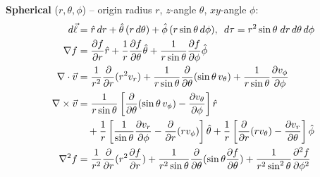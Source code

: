 \documentclass[12pt, a4paper]{article}
\begin{document}
\begin{multicols*}{3}
\textbf{Spherical} ($r, \theta, \phi$) -- origin radius $r$, $z$-angle $\theta$, $xy$-angle $\phi$: 
\begin{align*}
  d\vec{\ell} &= \hat{r}\,dr 
        + \hat{\theta}\,(r\,d\theta)
        + \hat{\phi}\,(r\sin\theta\,d\phi),\hspace{0.5em} d\tau = r^{2}\sin\theta \;dr\,d\theta\,d\phi\\
  \nabla f &= \frac{\partial f}{\partial r}\hat{r} + \frac{1}{r}\frac{\partial f}{\partial \theta} \hat{\theta} + \frac{1}{r\sin\theta}\frac{\partial f}{\partial \phi}\hat{\phi}\\
  \nabla \cdot \vec{v} &= \frac{1}{r^2}\frac{\partial}{\partial r}(r^2v_r) + \frac{1}{r\sin\theta}\frac{\partial}{\partial \theta}(\sin\theta\,v_\theta) + \frac{1}{r\sin\theta}\frac{\partial v_{\phi}}{\partial\phi} \\
  \nabla \times \vec{v} &= \frac{1}{r\sin\theta}\left[\frac{\partial}{\partial\theta}(\sin\theta\,v_\phi)-\frac{\partial v_\theta}{\partial\phi} \right]\hat{r}\\
                        &\quad + \frac{1}{r}\left[\frac{1}{\sin\theta}\frac{\partial v_r}{\partial \phi} - \frac{\partial}{\partial r}(rv_\phi) \right] \hat{\theta} + \frac{1}{r}\left[ \frac{\partial}{\partial r}(rv_\theta) - \frac{\partial v_r}{\partial\theta} \right] \hat{\phi}\\ 
    \nabla^2f &= \frac{1}{r^2}\frac{\partial}{\partial r}(r^2 \frac{\partial f}{\partial r}) + \frac{1}{r^2\sin\theta} \frac{\partial}{\partial \theta}(\sin\theta \frac{\partial f}{\partial \theta}) + \frac{1}{r^2\sin^2\theta}\frac{\partial^2 f}{\partial\phi^2}
\end{align*}


\end{multicols*}
\end{document}
